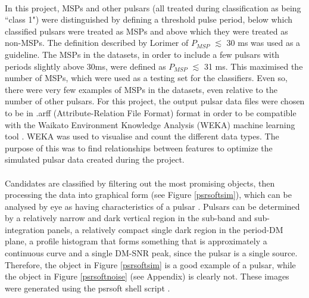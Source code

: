\documentclass[12pt]{article}
\begin{document}
\paragraph{}
In this project, MSPs and other pulsars (all treated during classification as being ``class 1") were distinguished by defining a threshold pulse period, below which classified pulsars were treated as MSPs and above which they were treated as non-MSPs. The definition described by Lorimer \cite{lorimer2008binary} of $P_{MSP}$ $\lesssim$ 30 ms was used as a guideline. The MSPs in the datasets, in order to include a few pulsars with periods slightly above 30ms, were defined as $P_{MSP}$ $\lesssim$ 31 ms. This maximised the number of MSPs, which were used as a testing set for the classifiers. Even so, there were very few examples of MSPs in the datasets, even relative to the number of other pulsars. For this project, the output pulsar data files were chosen to be in .arff (Attribute-Relation File Format) format in order to be compatible with the Waikato Environment Knowledge Analysis (WEKA) machine learning tool \cite{hall2009weka}. WEKA was used to visualise and count the different data types. The purpose of this was to find relationships between features to optimize the simulated pulsar data created during the project.
\paragraph{}
Candidates are classified by filtering out the most promising objects, then processing the data into graphical form (see Figure \ref{psrsoftsim}), which can be analysed by eye as having characteristics of a pulsar \cite{morello2014spinn}. Pulsars can be determined by a relatively narrow and dark vertical region in the sub-band and sub-integration panels, a relatively compact single dark region in the period-DM plane, a profile histogram that forms something that is approximately a continuous curve and a single DM-SNR peak, since the pulsar is a single source. Therefore, the object in Figure \ref{psrsoftsim} is a good example of a pulsar, while the object in Figure \ref{psrsoftnoise} (see Appendix) is clearly not. These images were generated using the psrsoft shell script \cite{thornton2013high}.
\end{document}
